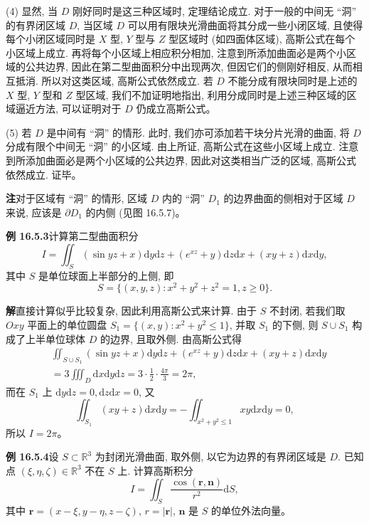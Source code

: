\documentclass[UTF8, 12pt, fontset=fandol, oneside]{ctexart}
\begin{document}
(4) 显然, 当 $D$ 刚好同时是这三种区域时, 定理结论成立. 对于一般的中间无 ``洞'' 的有界闭区域 $D$, 当区域 $D$ 可以用有限块光滑曲面将其分成一些小闭区域, 且使得每个小闭区域同时是 $X$ 型, $Y$ 型与 $Z$ 型区域时 (如四面体区域), 高斯公式在每个小区域上成立. 再将每个小区域上相应积分相加, 注意到所添加曲面必是两个小区域的公共边界, 因此在第二型曲面积分中出现两次, 但因它们的侧刚好相反, 从而相互抵消. 所以对这类区域, 高斯公式依然成立. 若 $D$ 不能分成有限块同时是上述的 $X$ 型, $Y$ 型和 $Z$ 型区域, 我们不加证明地指出, 利用分成同时是上述三种区域的区域逼近方法, 可以证明对于 $D$ 仍成立高斯公式。

(5) 若 $D$ 是中间有 ``洞'' 的情形. 此时, 我们亦可添加若干块分片光滑的曲面, 将 $D$ 分成有限个中间无 ``洞'' 的小区域. 由上所证, 高斯公式在这些小区域上成立. 注意到所添加曲面必是两个小区域的公共边界, 因此对这类相当广泛的区域, 高斯公式依然成立. 证毕。

\noindent\textbf{注}\quad 对于区域有 ``洞'' 的情形, 区域 $D$ 内的 ``洞'' $D_1$ 的边界曲面的侧相对于区域 $D$ 来说, 应该是 $\partial D_1$ 的内侧 (见图 16.5.7)。

\noindent\textbf{例 16.5.3}\quad 计算第二型曲面积分
\[
  I=\iint_S(\sin yz+x)\mathrm dy\mathrm dz+(e^{xz}+y)\mathrm dz\mathrm dx+(xy+z)\mathrm dx\mathrm dy,
\]
其中 $S$ 是单位球面上半部分的上侧, 即
\[
  S=\{(x,y,z):x^2+y^2+z^2=1,z\geqslant0\}.
\]

\noindent\textbf{解}\quad 直接计算似乎比较复杂, 因此利用高斯公式来计算. 由于 $S$ 不封闭, 若我们取 $Oxy$ 平面上的单位圆盘 $S_1=\{(x,y):x^2+y^2\leqslant1\}$, 并取 $S_1$ 的下侧, 则 $S\cup S_1$ 构成了上半单位球体 $D$ 的边界, 且取外侧. 由高斯公式得
\[
\begin{aligned}
  &\iint_{S\cup S_1}(\sin yz+x)\mathrm dy\mathrm dz+(e^{xz}+y)\mathrm dz\mathrm dx+(xy+z)\mathrm dx\mathrm dy\\
  &=3\iiint_D\mathrm dx\mathrm dy\mathrm dz
    =3\cdot\frac12\cdot\frac{4\pi}{3}=2\pi,
\end{aligned}
\]
而在 $S_1$ 上 $\mathrm dy\mathrm dz=0,\mathrm dz\mathrm dx=0$, 又
\[
  \iint_{S_1}(xy+z)\mathrm dx\mathrm dy
  =-\iint_{x^2+y^2\leqslant1}xy\mathrm dx\mathrm dy=0,
\]
所以 $I=2\pi$。

\noindent\textbf{例 16.5.4}\quad 设 $S\subset\mathbb R^3$ 为封闭光滑曲面, 取外侧, 以它为边界的有界闭区域是 $D$. 已知点 $(\xi,\eta,\zeta)\in\mathbb R^3$ 不在 $S$ 上. 计算高斯积分
\[
  I=\iint_S\frac{\cos(\boldsymbol r,\boldsymbol n)}{r^2}\mathrm dS,
\]
其中 $\boldsymbol r=(x-\xi,y-\eta,z-\zeta)$, $r=|\boldsymbol r|$, $\boldsymbol n$ 是 $S$ 的单位外法向量。
\end{document}
